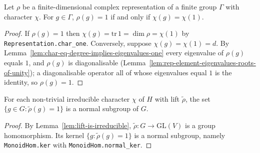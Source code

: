 \begin{lemma}
    \label{lem:trace-eq-degree-iff-identity}
    \leanok
    Let $\rho$ be a finite-dimensional complex representation of a finite group
    $\Gamma$ with character $\chi$. For $g \in \Gamma$, $\rho(g) = 1$ if and only
    if $\chi(g) = \chi(1)$.
\end{lemma}
\begin{proof}
    If $\rho(g) = 1$ then $\chi(g) = \mathrm{tr}\,1 = \dim\rho = \chi(1)$ by
    \texttt{Representation.char\_one}. Conversely, suppose $\chi(g) = \chi(1) = d$.
    By Lemma~\ref{lem:char-eq-degree-implies-eigenvalues-one} every eigenvalue of
    $\rho(g)$ equals $1$, and $\rho(g)$ is diagonalisable
    (Lemma~\ref{lem:rep-element-eigenvalues-roots-of-unity}); a diagonalisable
    operator all of whose eigenvalues equal $1$ is the identity, so $\rho(g) = 1$.
\end{proof}

\begin{lemma}
    \label{lem:lifted-kernel-is-normal-subgroup}
    \leanok
    For each non-trivial irreducible character $\chi$ of $H$ with lift
    $\widetilde{\rho}$, the set $\{g \in G : \widetilde{\rho}(g) = 1\}$ is a normal
    subgroup of $G$.
\end{lemma}
\begin{proof}
    By Lemma~\ref{lem:lift-is-irreducible}, $\widetilde{\rho} : G \to
    \mathrm{GL}(V)$ is a group homomorphism. Its kernel $\{g : \widetilde\rho(g) =
    1\}$ is a normal subgroup, namely \texttt{MonoidHom.ker} with
    \texttt{MonoidHom.normal\_ker}.
\end{proof}

